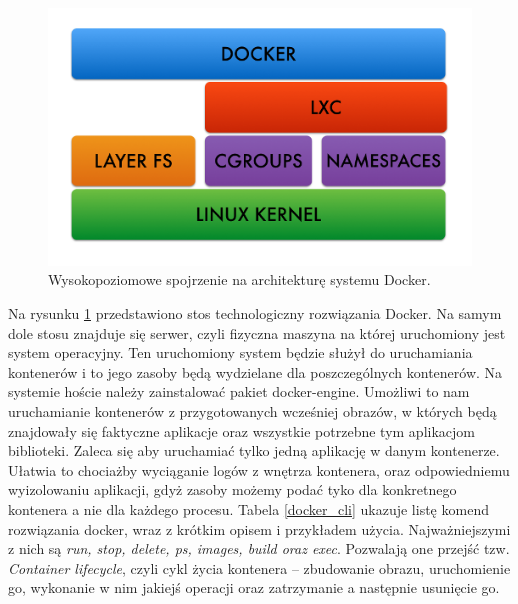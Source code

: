 \documentclass[10pt,a4paper,titlepage,twoside]{report}
\begin{document}
\begin{figure}[ht!]
	\centering
	\includegraphics[scale=0.7]{pics/docker_arch.png}
	\caption{Wysokopoziomowe spojrzenie na architekturę systemu Docker.}
	\label{docker_arch}
\end{figure}

Na rysunku \ref{docker_arch} przedstawiono stos technologiczny rozwiązania Docker. Na samym dole stosu znajduje się serwer, czyli fizyczna maszyna na której uruchomiony jest system operacyjny. Ten uruchomiony system będzie służył do uruchamiania kontenerów i to jego zasoby będą wydzielane dla poszczególnych kontenerów. Na systemie hoście należy zainstalować pakiet docker-engine. Umożliwi to nam uruchamianie kontenerów z przygotowanych wcześniej obrazów, w których będą znajdowały się faktyczne aplikacje oraz wszystkie potrzebne tym aplikacjom biblioteki. Zaleca się aby uruchamiać tylko jedną aplikację w danym kontenerze. Ułatwia to chociażby wyciąganie logów z wnętrza kontenera, oraz odpowiedniemu wyizolowaniu aplikacji, gdyż zasoby możemy podać tyko dla konkretnego kontenera a nie dla każdego procesu. Tabela \ref{docker_cli} ukazuje listę komend rozwiązania docker, wraz z krótkim opisem i przykładem użycia. Najważniejszymi z nich są \textit{run, stop, delete, ps, images, build oraz exec}. Pozwalają one przejść tzw. \textit{Container lifecycle}, czyli cykl życia kontenera – zbudowanie obrazu, uruchomienie go, wykonanie w nim jakiejś operacji oraz zatrzymanie a następnie usunięcie go.
\end{document}
